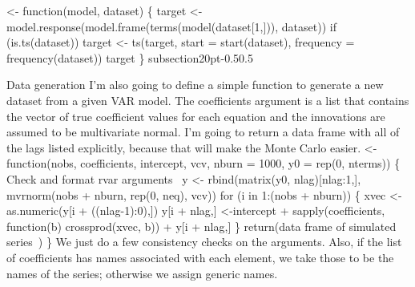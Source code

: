 \documentclass[10pt]{article}%
\makeatletter
\renewcommand\subsection{\@startsection%
{subsection}{2}{0pt}{-0.5\baselineskip}{0.5\baselineskip}%
{\normalfont\normalsize\bfseries\small\raggedright}}
\makeatother
\begin{document}
 <- function(model, dataset) \{
  target <- model.response(model.frame(terms(model(dataset[1,])), dataset))
  if (is.ts(dataset))
    target <- ts(target, start = start(dataset), frequency = frequency(dataset))
  target
\}
\eatline
{}\nwendcode{}\nwdocspar
\subsection{Data generation}
I'm also going to define a simple function to generate a new dataset
from a given VAR model.  The {\Tt{}coefficients\nwendquote} argument is a list that
contains the vector of true coefficient values for each equation and
the innovations are assumed to be multivariate normal.  I'm going to
return a data frame with all of the lags listed explicitly, because
that will make the Monte Carlo easier.
\nwenddocs{}\endmoddef\nwstartdeflinemarkup\nwenddeflinemarkup
{} <- function(nobs, coefficients, intercept, vcv, 
                 nburn = 1000, y0 = rep(0, nterms)) \{
  \LA{}Check and format \code{}rvar\edoc{} arguments~{\nwtagstyle{}}\RA{}
  y <- rbind(matrix(y0, nlag)[nlag:1,], mvrnorm(nobs + nburn, rep(0, neq), vcv))
  for (i in 1:(nobs + nburn)) \{
    xvec <- as.numeric(y[i + ((nlag-1):0),])
    y[i + nlag,] <-intercept + sapply(coefficients, function(b) 
                                      crossprod(xvec, b)) + y[i + nlag,]
  \}
  return(\LA{}data frame of simulated series~{\nwtagstyle{}}\RA{})
\}
\eatline
{}\nwendcode{}We just do a few consistency checks on the arguments.  Also, if the
list of coefficients has names associated with each element, we take
those to be the names of the series; otherwise we assign generic names.
\nwenddocs{}\endmoddef\nwstartdeflinemarkup{}\nwenddeflinemarkup
\end{document}
